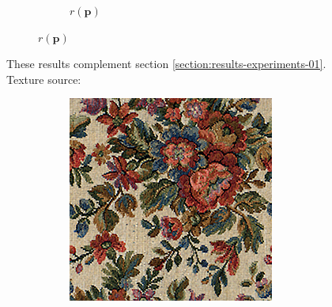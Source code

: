 \begin{figure}[]
\begin{subfigure}{\textwidth}
\begin{subfigure}{0.24\textwidth}
            \caption*{\(r(\bm{p})\)}
        \end{subfigure}
    \end{subfigure}
    \caption{These results complement section \ref{section:results-experiments-01}. Texture source: \citet{Gatys2015}}
    \label{fig:ex01-complete-pebbles-1000steps}
\end{figure}

\begin{figure}[]
    \centering    
    \begin{subfigure}{\textwidth}
        \centering
        \begin{subfigure}{0.24\textwidth}
            \centering
            \includegraphics[width=\textwidth]{images/04-experiment01/flowers/target.jpg}
            \caption*{}
        \end{subfigure}
        \hfill
        \begin{subfigure}{0.24\textwidth}
            \centering

\end{subfigure}
\end{subfigure}
\end{figure}
